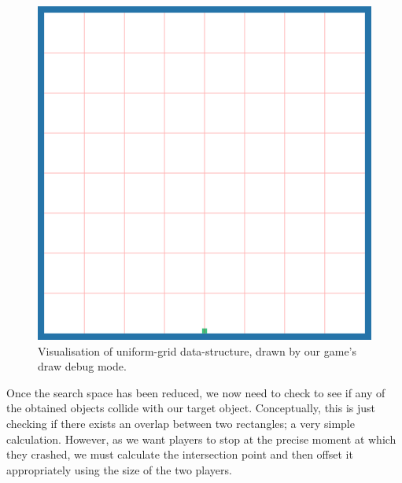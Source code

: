 \documentclass{standalone}
\begin{document}
			\begin{figure}[!htbp]
				\centering
				\includegraphics[width=.8\textwidth]{resources/images/uniformgrid.png}
				\caption{Visualisation of uniform-grid data-structure, drawn by our game's draw debug mode.}
			\end{figure}
			\FloatBarrier

			Once the search space has been reduced, we now need to check to see if any of the obtained objects collide with our target object. Conceptually, this is just checking if there exists an overlap between two rectangles; a very simple calculation. However, as we want players to stop at the precise moment at which they crashed, we must calculate the intersection point and then offset it appropriately using the size of the two players.
\end{document}
